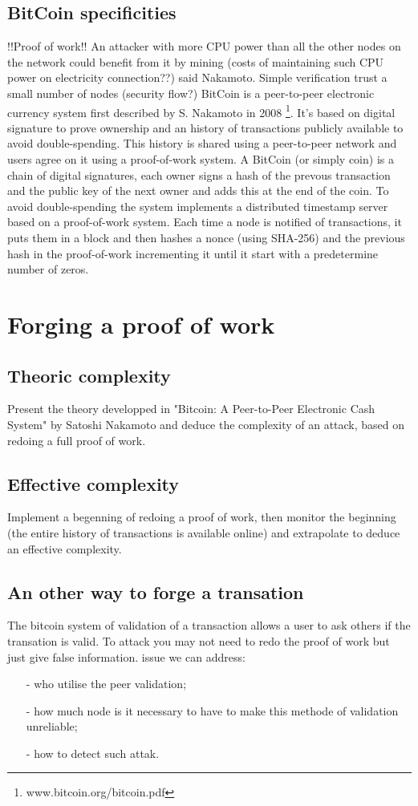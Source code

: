 \documentclass{acm_proc_article-sp}
\begin{document}
\subsection{BitCoin specificities}
!!Proof of work!!
An attacker with more CPU power than all the other nodes on the network
could benefit from it by mining (costs of maintaining such CPU
power on electricity connection??) said Nakamoto. Simple verification 
trust a small number of nodes (security flow?)
BitCoin is a peer-to-peer electronic currency system first described
by S. Nakamoto in 2008 \footnote{www.bitcoin.org/bitcoin.pdf}. It's based on
digital signature to prove ownership and an history of transactions publicly 
available to avoid double-spending. This history is shared using a peer-to-peer 
network and users agree on it using a proof-of-work system.
A BitCoin (or simply coin) is a chain of digital signatures, each owner signs
a hash of the prevous transaction and the public key of the next owner and 
adds this at the end of the coin. To avoid double-spending the system implements
a distributed timestamp server based on a proof-of-work system. Each time a 
node is notified of transactions, it puts them in a block and then hashes a
nonce (using SHA-256) and the previous hash in the proof-of-work incrementing 
it until it start with a predetermine number of zeros.     


\section{Forging a proof of work}
\subsection{Theoric complexity}
Present the theory developped in "Bitcoin: A Peer-to-Peer Electronic Cash System" by Satoshi Nakamoto and deduce the complexity of
an attack, based on redoing a full proof of work.

\subsection{Effective complexity}
Implement a begenning of redoing a proof of work, then monitor the 
beginning (the entire history of transactions is available online)
and extrapolate to deduce an effective complexity.
\subsection{An other way to forge a transation}
The bitcoin system of validation of a transaction allows a user to ask others if the transation is valid. To attack you may not need to redo the proof of work but just give false information. issue we can address:
\begin{itemize}

\item[-] who utilise the peer validation;
\item [-]how much node is it necessary to have to make this methode of validation unreliable;
\item[-] how to detect such attak.

\end{itemize}
\end{document}
